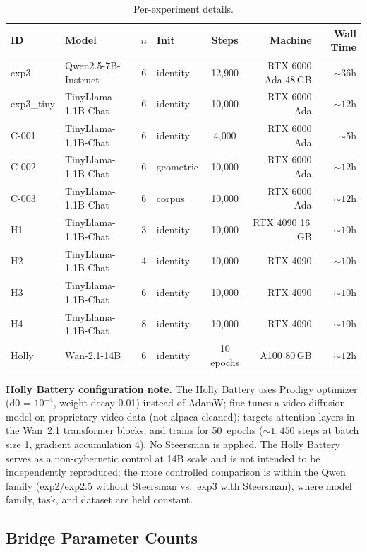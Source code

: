 \documentclass[11pt]{article}
\begin{document}
\begin{table}[H]
\centering
\caption{Per-experiment details.}
\label{tab:perexp}
\small
\begin{tabular}{llclcrr}
\toprule
ID & Model & $n$ & Init & Steps & Machine & Wall Time \\
\midrule
exp3 & Qwen2.5-7B-Instruct & 6 & identity & 12{,}900 & RTX 6000 Ada 48\,GB & ${\sim}36$h \\
exp3\_tiny & TinyLlama-1.1B-Chat & 6 & identity & 10{,}000 & RTX 6000 Ada & ${\sim}12$h \\
C-001 & TinyLlama-1.1B-Chat & 6 & identity & 4{,}000 & RTX 6000 Ada & ${\sim}5$h \\
C-002 & TinyLlama-1.1B-Chat & 6 & geometric & 10{,}000 & RTX 6000 Ada & ${\sim}12$h \\
C-003 & TinyLlama-1.1B-Chat & 6 & corpus & 10{,}000 & RTX 6000 Ada & ${\sim}12$h \\
H1 & TinyLlama-1.1B-Chat & 3 & identity & 10{,}000 & RTX 4090 16\,GB & ${\sim}10$h \\
H2 & TinyLlama-1.1B-Chat & 4 & identity & 10{,}000 & RTX 4090 & ${\sim}10$h \\
H3 & TinyLlama-1.1B-Chat & 6 & identity & 10{,}000 & RTX 4090 & ${\sim}10$h \\
H4 & TinyLlama-1.1B-Chat & 8 & identity & 10{,}000 & RTX 4090 & ${\sim}10$h \\
Holly & Wan-2.1-14B & 6 & identity & 10 epochs & A100 80\,GB & ${\sim}12$h \\
\bottomrule
\end{tabular}
\end{table}

\noindent\textbf{Holly Battery configuration note.} The Holly Battery
uses Prodigy optimizer (d0 = $10^{-4}$, weight decay 0.01) instead of
AdamW; fine-tunes a video diffusion model on proprietary video data
(not alpaca-cleaned); targets attention layers in the Wan~2.1
transformer blocks; and trains for 50~epochs (${\sim}1{,}450$ steps at
batch size 1, gradient accumulation 4). No Steersman is applied. The
Holly Battery serves as a non-cybernetic control at 14B scale and is
not intended to be independently reproduced; the more controlled
comparison is within the Qwen family (exp2/exp2.5 without Steersman
vs.\ exp3 with Steersman), where model family, task, and dataset are
held constant.

\subsection{Bridge Parameter Counts}
\end{document}

